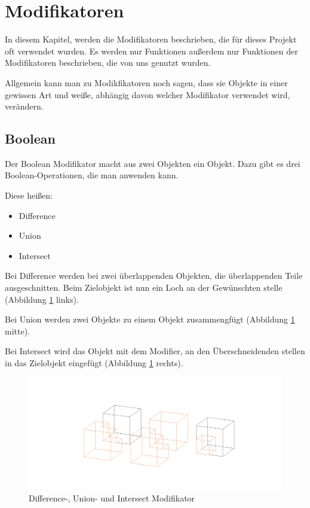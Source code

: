 \section{Modifikatoren}
In diesem Kapitel, werden die Modifikatoren beschrieben, die für dieses Projekt oft verwendet wurden. Es werden nur Funktionen außerdem nur
Funktionen der Modifikatoren beschrieben, die von uns genutzt wurden.

Allgemein kann man zu Modikfikatoren noch sagen, dass sie Objekte in einer gewissen Art und weiße, abhängig davon welcher Modifikator verwendet wird, verändern.
\subsection{Boolean}
\citep{blender:boolean_modifier} Der Boolean Modifikator macht aus zwei Objekten ein Objekt. Dazu gibt es
drei Boolean-Operationen, die man anwenden kann.

Diese heißen:
\begin{itemize}
    \item  Difference
    \item  Union
    \item  Intersect
\end{itemize}

Bei Difference werden bei zwei überlappenden Objekten, die überlappenden Teile ausgeschnitten. Beim Zielobjekt ist nun ein Loch an der Gewünschten stelle (Abbildung \ref{modifikatoren:image1} links).

Bei Union werden zwei Objekte zu einem Objekt zusammengfügt (Abbildung \ref{modifikatoren:image1} mitte).

Bei Intersect wird das Objekt mit dem Modifier, an den Überschneidenden stellen in das Zielobjekt eingefügt (Abbildung \ref{modifikatoren:image1} rechts).

\begin{figure}[h]
    \centering
    \includegraphics[width=.8\textwidth]{images/Modifikatoren-Boolean.png}
    \caption{Difference-, Union- und Intersect Modifikator}
    \label{modifikatoren:image1}
\end{figure}


